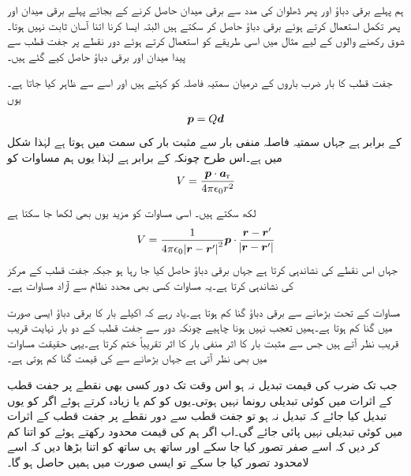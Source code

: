 ہم پہلے برقی دباؤ اور پھر ڈھلوان کی مدد سے برقی میدان حاصل کرنے کے بجائے پہلے برقی میدان اور پھر تکمل استعمال کرتے ہوئے برقی دباؤ حاصل کر سکتے ہیں البتہ ایسا کرنا اتنا آسان ثابت نہیں ہوتا۔شوق رکھنے والوں کے لیے مثال  میں اسی طریقے کو استعمال کرتے ہوئے دور نقطے پر جفت قطب  سے پیدا میدان اور برقی دباؤ حاصل کیے گئے ہیں۔

جفت قطب کا بار  ضرب باروں کے درمیان سمتیہ فاصلہ  کو   کہتے ہیں اور اسے  سے ظاہر کیا جاتا ہے۔یوں 
\begin{align}\label{مساوات_توانائی_سمتی_جفت_قطب}
{\ensuremath{{\boldsymbol{p}}}}=Q {{\boldsymbol{d}}}
\end{align}
کے برابر ہے جہاں سمتیہ فاصلہ منفی بار سے مثبت بار کی سمت میں ہوتا ہے لہٰذا شکل  میں  ہے۔اس طرح چونکہ  کے برابر ہے لہٰذا یوں ہم مساوات  کو
\begin{align}
V=\frac{{{\boldsymbol{p}}} \cdot {\boldsymbol{a}}_{\textup{r}}}{4 \pi \epsilon_0 r^2}
\end{align} 

لکھ سکتے ہیں۔ اسی مساوات کو مزید یوں بھی لکھا جا سکتا ہے
\begin{align}
V=\frac{1}{4\pi \epsilon_0 \abs{{{\boldsymbol{r}}}-{{\boldsymbol{r}}}'}^2} {{\boldsymbol{p}}} \cdot \frac{{{\boldsymbol{r}}}-{{\boldsymbol{r}}}'}{\abs{{{\boldsymbol{r}}}-{{\boldsymbol{r}}}'}}
\end{align}
جہاں  اس نقطے کی نشاندہی کرتا ہے جہاں برقی دباؤ حاصل کیا جا رہا ہو جبکہ  جفت قطب کے مرکز کی نشاندہی کرتا ہے۔یہ مساوات کسی بھی محدد نظام سے آزاد مساوات ہے۔

مساوات  کے تحت  بڑھانے سے  برقی دباؤ  گنا کم ہوتا ہے۔یاد رہے کہ اکیلے بار کا برقی دباؤ ایسی صورت میں  گنا کم ہوتا ہے۔ہمیں تعجب نہیں ہونا چاہیے چونکہ دور سے جفت قطب کے دو بار نہایت قریب قریب نظر آتے ہیں جس سے مثبت بار کا اثر منفی بار کا اثر تقریباً ختم کرتا ہے۔یہی حقیقت مساوات  میں بھی نظر آتی ہے جہاں  بڑھانے سے   کی قیمت  گنا کم ہوتی ہے۔

جب تک  ضرب  کی قیمت تبدیل نہ ہو اس وقت تک دور کسی بھی نقطے پر جفت قطب کے اثرات میں کوئی تبدیلی رونما نہیں ہوتی۔یوں  کو کم  یا زیادہ کرتے ہوئے اگر  کو یوں تبدیل کیا جائے کہ  تبدیل نہ ہو تو جفت قطب سے دور نقطے پر جفت قطب کے اثرات میں کوئی تبدیلی نہیں پائی جائے گی۔اب اگر  ہم  کی قیمت محدود رکھتے ہوئے   کو اتنا کم کر دیں کہ اسے صفر تصور  کیا جا سکے  اور ساتھ ہی ساتھ  کو اتنا بڑھا دیں کہ اسے لامحدود تصور کیا جا سکے  تو ایسی صورت میں ہمیں  حاصل ہو گا۔


